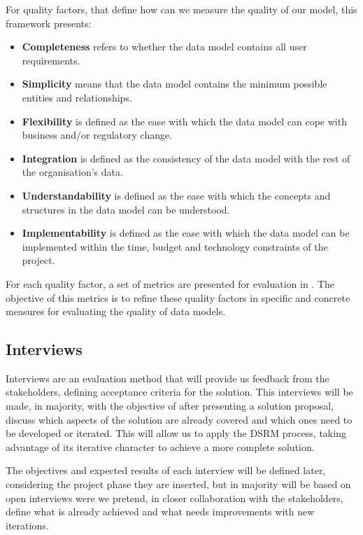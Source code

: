 For quality factors, that define how can we measure the quality of our model, this framework presents:

\begin{itemize}
\item \textbf{Completeness} refers to whether the data model contains all user requirements.
\item \textbf{Simplicity} means that the data model contains the minimum possible entities and relationships.
\item \textbf{Flexibility} is defined as the ease with which the data model can cope with business and/or regulatory change.
\item \textbf{Integration} is defined as the consistency of the data model with the rest of the organisation’s data.
\item \textbf{Understandability} is defined as the ease with which the concepts and structures in the data model can be understood.
\item \textbf{Implementability} is defined as the ease with which the data model can be implemented within the time, budget and technology constraints of the project.
\end{itemize}

For each quality factor, a set of metrics are presented for evaluation in \cite{moody1998metrics}. The objective of this metrics is to refine these quality factors in specific and concrete measures for evaluating the quality of data models. 

\subsection{Interviews}

Interviews are an evaluation method that will provide us feedback from the stakeholders, defining acceptance criteria for the solution. This interviews will be made, in majority, with the objective of after presenting a solution proposal, discuss which aspects of the solution are already covered and which ones need to be developed or iterated. This will allow us to apply the DSRM process, taking advantage of its iterative character to achieve a more complete solution.\par
The objectives and expected results of each interview will be defined later, considering the project phase they are inserted, but in majority will be based on open interviews were we pretend, in closer collaboration with the stakeholders, define what is already achieved and what needs improvements with new iterations.\par  


